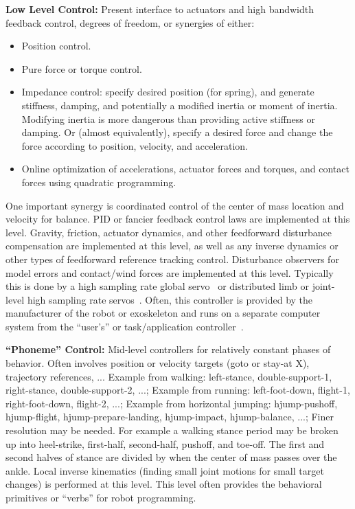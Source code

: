 \documentclass[letterpaper,12pt,fullpage]{article}
\begin{document}
{\bf Low Level Control:} Present interface to actuators and
high bandwidth feedback control, degrees of freedom,
or synergies of either:
\begin{itemize}
\item
Position control.
\item
Pure force or torque control.
\item
Impedance control: specify desired position (for spring), and generate
stiffness, damping, and potentially a modified inertia or moment of inertia.
Modifying inertia is more dangerous than providing active stiffness
or damping.
Or (almost equivalently),
specify a desired force and change the force according to position, velocity,
and acceleration.
\item
Online optimization of accelerations, actuator forces and torques, and contact forces
using quadratic programming.
\end{itemize} 
One important synergy is coordinated control of the center of mass location and
velocity for balance.
PID or fancier feedback control laws are implemented at this level.
Gravity, friction, actuator dynamics, and other feedforward disturbance
compensation are implemented at this level, as well as any inverse dynamics
or other types of feedforward reference tracking control.
Disturbance observers for model errors and contact/wind forces
are implemented at this level.
Typically this is done by a high sampling rate global servo~\cite{Atlas-robot}
or distributed limb or joint-level high sampling rate servos~\cite{Sarcos-robot}.
Often, this controller is provided by the manufacturer of the robot
or exoskeleton and runs on a separate computer system from the
``user's'' or task/application controller~\cite{Sarcos,Atlas}.

{\bf ``Phoneme'' Control:} Mid-level controllers
for relatively constant phases of behavior.
Often involves position or velocity targets (goto or
stay-at X), trajectory references, ...
Example from walking: left-stance, double-support-1, right-stance, double-support-2, ...;
Example from running: left-foot-down, flight-1, right-foot-down, flight-2, ...;
Example from horizontal jumping: hjump-pushoff, hjump-flight, hjump-prepare-landing, hjump-impact, hjump-balance, ...;
Finer resolution may be needed. For example a walking stance period may
be broken up into heel-strike, first-half, second-half, pushoff, and toe-off.
The first and second halves of stance are divided by when the center of mass
passes over the ankle.
Local inverse kinematics (finding small joint motions for small target changes)
is performed at this level.
This level often provides the behavioral primitives or ``verbs'' for robot programming.
\end{document}
